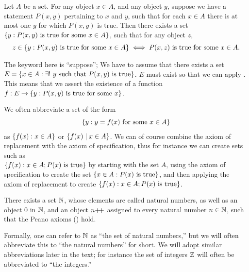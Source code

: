 \begin{ax}[Replacement]\label{i:3.6}
  Let \(A\) be a set.
  For any object \(x \in A\), and any object \(y\), suppose we have a statement \(P(x, y)\) pertaining to \(x\) and \(y\), such that for each \(x \in A\) there is at most one \(y\) for which \(P(x, y)\) is true.
  Then there exists a set \(\left\lbrace y : P(x, y) \text{ is true for some } x \in A\right\rbrace\), such that for any object \(z\),
  \[
    z \in \left\lbrace y: P(x, y) \text{ is true for some } x \in A\right\rbrace \iff P(x, z) \text{ is true for some } x \in A.
  \]
\end{ax}

\begin{note}
  The keyword here is ``suppose'';
  We have to assume that there exists a set \(E = \left\lbrace x \in A : \exists!\ y \text{ such that } P(x, y) \text{ is true}\right\rbrace\).
  \(E\) must exist so that we can apply .
  This means that we assert the existence of a function \(f : E \to \left\lbrace y : P(x, y) \text{ is true for some } x\right\rbrace\).
\end{note}

\begin{note}
  We often abbreviate a set of the form
  \[
    \left\lbrace y : y = f(x) \text{ for some } x \in A\right\rbrace
  \]
  as \(\left\lbrace f(x) : x \in A\right\rbrace\) or \(\left\lbrace f(x) \mid x \in A\right\rbrace\).
  We can of course combine the axiom of replacement with the axiom of specification, thus for instance we can create sets such as \\
  \(\left\lbrace f(x) : x \in A; P(x) \text{ is true}\right\rbrace\) by starting with the set \(A\), using the axiom of specification to create the set \(\left\lbrace x \in A : P(x) \text{ is true}\right\rbrace\), and then applying the axiom of replacement to create \(\left\lbrace f(x) : x \in A; P(x) \text{ is true}\right\rbrace\).
\end{note}

\begin{ax}[Infinity]\label{i:3.7}
  There exists a set \(\mathbb{N}\), whose elements are called natural numbers, as well as an object \(0\) in \(\mathbb{N}\), and an object \(n{+}\!{+}\) assigned to every natural number \(n \in \mathbb{N}\), such that the Peano axioms () hold.
\end{ax}

\begin{note}
  Formally, one can refer to \(\mathbb{N}\) as ``the set of natural numbers,'' but we will often abbreviate this to ``the natural numbers'' for short.
  We will adopt similar abbreviations later in the text;
  for instance the set of integers \(\mathbb{Z}\) will often be abbreviated to ``the integers.''
\end{note}

